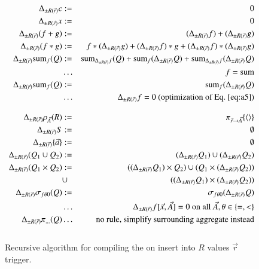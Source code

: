 \documentclass{article}
\newcommand{\tuple}[1]{{\langle#1\rangle}}
\begin{document}
\begin{figure*}
\begin{eqnarray}
\label{eq:a1}
\Delta_{\pm R(\vec{r})} c       &:=& 0 \\
\label{eq:a2}
\Delta_{\pm R(\vec{r})} x       &:=& 0 \\
\label{eq:a3}
\Delta_{\pm R(\vec{r})} (f + g) &:=& (\Delta_{\pm R(\vec{r})} f) + (\Delta_{\pm R(\vec{r})} g) \\
\label{eq:a4}
\Delta_{\pm R(\vec{r})} (f * g) &:=&         f                * (\Delta_{\pm R(\vec{r})} g)
                              +   (\Delta_{\pm R(\vec{r})} f) * g                        
                              +   (\Delta_{\pm R(\vec{r})} f) * (\Delta_{\pm R(\vec{r})} g)
\\
\label{eq:a5}
\Delta_{\pm R(\vec{r})} \algsum_f(Q) &:=&
   \algsum_{\Delta_{\pm R(\vec{r})} f}(Q)
   + \algsum_f(\Delta_{\pm R(\vec{r})} Q)
   + \algsum_{\Delta_{\pm R(\vec{r})} f}(\Delta_{\pm R(\vec{r})} Q)
\\
\nonumber
&\dots& \mbox{$f = \algsum$}
\\
\label{eq:a6}
\Delta_{\pm R(\vec{r})} \algsum_f(Q) &:=&
   \algsum_f(\Delta_{\pm R(\vec{r})} Q)
\\
\nonumber
&\dots& \mbox{$\Delta_{\pm R(\vec{r})} f = 0$ (optimization of Eq.~\ref{eq:a5})}
%
%
\\[2ex]
\label{eq:b1}
\Delta_{\pm R(\vec{r})} \rho_{\vec{A}}(R) &:=& \pi_{\vec{r} \rightarrow \vec{A}}\{\tuple{}\}
\\
\label{eq:b2}
\Delta_{\pm R(\vec{r})} S &:=& \emptyset
\\
\label{eq:b3}
\Delta_{\pm R(\vec{r})} \{ \vec{a} \} &:=& \emptyset 
\\
\label{eq:b4}
\Delta_{\pm R(\vec{r})} (Q_1 \cup Q_2) &:=&
(\Delta_{\pm R(\vec{r})} Q_1) \cup (\Delta_{\pm R(\vec{r})} Q_2)
\\
\label{eq:b5}
\Delta_{\pm R(\vec{r})} (Q_1 \times Q_2) &:=&
((\Delta_{\pm R(\vec{r})} Q_1) \times Q_2) \cup
(Q_1 \times (\Delta_{\pm R(\vec{r})} Q_2)) \\
\nonumber
&\cup&
((\Delta_{\pm R(\vec{r})} Q_1) \times (\Delta_{\pm R(\vec{r})} Q_2))
\\
\label{eq:b6}
\Delta_{\pm R(\vec{r})} \sigma_{f \theta 0}(Q) &:=&
\sigma_{f \theta 0}(\Delta_{\pm R(\vec{r})} Q)
\\
\nonumber
&\dots& \Delta_{\pm R(\vec{r})} f[\vec{x}, \vec{A}] = 0 \mbox{ on all $\vec{A}$}, \theta \in \{=,<\}
\\
\nonumber
\Delta_{\pm R(\vec{r})} \pi_{\dots}(Q) &\dots& \mbox{no rule, simplify 
surrounding aggregate instead}
\\[2ex]
%
%
\end{eqnarray}

\vspace{-4mm}

\caption{Recursive algorithm for compiling the
on insert into $R$ values $\vec{r}$ trigger.}
\label{fig:mainalg}
\end{figure*}
\end{document}
